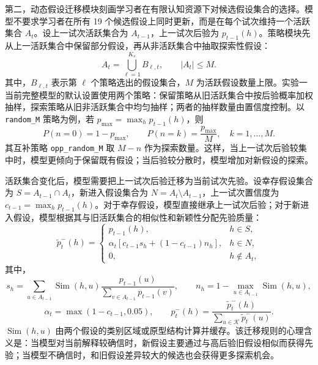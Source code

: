 第二，动态假设迁移模块刻画学习者在有限认知资源下对候选假设集合的选择。模型不要求学习者在所有 19 个候选假设上同时更新，而是在每个试次维持一个活跃集合 $A_t$。设上一试次活跃集合为 $A_{t-1}$，上一试次后验为 $p_{t-1}(h)$。策略模块先从上一活跃集合中保留部分假设，再从非活跃集合中抽取探索性假设：
\begin{equation}
    A_t=\bigcup_{\ell=1}^{K_s}B_{\ell,t},\qquad |A_t|\leq M.
    \label{eq:exp1-hypothesis-set}
\end{equation}
其中，$B_{\ell,t}$ 表示第 $\ell$ 个策略选出的假设集合，$M$ 为活跃假设数量上限。实验一当前完整模型的默认设置使用两个策略：保留策略从旧活跃集合中按后验概率加权抽样，探索策略从旧非活跃集合中均匀抽样；两者的抽样数量由置信度控制。以 \texttt{random\_M} 策略为例，若 $p_{\max}=\max_h p_{t-1}(h)$，则
\begin{equation}
    P(n=0)=1-p_{\max},\qquad
    P(n=k)=\frac{p_{\max}}{M},\quad k=1,\ldots,M.
    \label{eq:exp1-random-amount}
\end{equation}
其互补策略 \texttt{opp\_random\_M} 取 $M-n$ 作为探索数量。这样，当上一试次后验较集中时，模型更倾向于保留既有假设；当后验较分散时，模型增加对新假设的探索。

活跃集合变化后，模型需要把上一试次后验迁移为当前试次先验。设幸存假设集合为 $S=A_{t-1}\cap A_t$，新进入假设集合为 $N=A_t\setminus A_{t-1}$，上一试次置信度为 $c_{t-1}=\max_h p_{t-1}(h)$。对于幸存假设，模型直接继承上一试次后验；对于新进入假设，模型根据其与旧活跃集合的相似性和新颖性分配先验质量：
\begin{equation}
    \tilde p_t^-(h)=
    \begin{cases}
        p_{t-1}(h), & h\in S,\\
        \alpha_t\left[c_{t-1}s_h+(1-c_{t-1})n_h\right], & h\in N,\\
        0, & h\notin A_t,
    \end{cases}
    \label{eq:exp1-hypothesis-transition}
\end{equation}
其中，
\begin{equation}
    s_h=\sum_{u\in A_{t-1}}\operatorname{Sim}(h,u)
    \frac{p_{t-1}(u)}{\sum_{v\in A_{t-1}}p_{t-1}(v)},\qquad
    n_h=1-\max_{u\in A_{t-1}}\operatorname{Sim}(h,u),
    \label{eq:exp1-sim-novelty}
\end{equation}
\begin{equation}
    \alpha_t=\max(1-c_{t-1},0.05),\qquad
    p_t^-(h)=\frac{\tilde p_t^-(h)}{\sum_{u\in\mathcal K}\tilde p_t^-(u)}.
    \label{eq:exp1-transition-normalize}
\end{equation}
$\operatorname{Sim}(h,u)$ 由两个假设的类别区域或原型结构计算并缓存。该迁移规则的心理含义是：当模型对当前解释较确信时，新假设主要通过与高后验旧假设相似而获得先验；当模型不确信时，和旧假设差异较大的候选也会获得更多探索机会。

